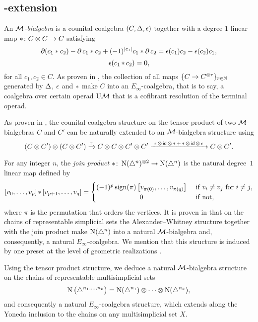 \subsection{\pdfEinfty-extension}\label{ss:e-infty extension}

An \textit{$\mathcal{M}$-bialgebra} is a counital coalgebra $(C, \operatorname{\Delta}, \operatorname{\epsilon})$ together with a degree $1$ linear map $\operatorname{\ast} \colon C \otimes C \to C$ satisfying
\[
\operatorname{\partial} (c_1 \ast c_2) - \operatorname{\partial} c_1 \ast c_2 + (-1)^{\lvert c_1\rvert} c_1 \ast \operatorname{\partial} c_2 =
\operatorname{\epsilon}(c_1) c_2 - \operatorname{\epsilon}(c_2) c_1,
\]
\[
\operatorname{\epsilon} (c_1 \operatorname{\ast} c_2) = 0,
\]
for all $c_1, c_2 \in C$.
As proven in \cite{medina2020prop1}, the collection of all maps $\{C \to C^{\otimes r}\}_{r \in \mathbb{N}}$ generated by $\operatorname{\Delta}$, $\operatorname{\epsilon}$ and $\operatorname{\ast}$ make $C$ into an $E_\infty$-coalgebra, that is to say, a coalgebra over certain operad $\mathrm{U}\mathcal{M}$ that is a cofibrant resolution of the terminal operad.

As proven in \cite{medina2021cobar}, the counital coalgebra structure on the tensor product of two $\mathcal{M}$-bialgebras $C$ and $C'$ can be naturally extended to an $\mathcal{M}$-bialgebra structure using
\[
(C \otimes C^\prime) \otimes (C \otimes C^\prime) \xrightarrow{\tau}
C \otimes C \otimes C^\prime \otimes C^\prime
\xrightarrow{\ \operatorname{\epsilon} \otimes \, \mathsf{id} \, \otimes \, \operatorname{\ast} + \operatorname{\ast} \otimes \, \mathsf{id} \, \otimes \,\operatorname{\epsilon}\ }
C \otimes C^\prime.
\]

For any integer $n$, the \textit{join product} $\ast \colon \operatorname{N}(\triangle^n)^{\otimes 2} \to \operatorname{N}(\triangle^n)$ is the natural degree~$1$ linear map defined by
\begin{equation*}
	\left[v_0, \dots, v_p \right] \pr \left[v_{p+1}, \dots, v_q\right] =
	\begin{cases}
		(-1)^{p} \sign(\pi) \left[v_{\pi(0)}, \dots, v_{\pi(q)}\right] &
		\text{ if } v_i \neq v_j \text{ for } i \neq j, \\
		\hfil 0 & \text{ if not},
	\end{cases}
\end{equation*}
where $\pi$ is the permutation that orders the vertices.
It is proven in \cite{medina2020prop1} that on the chains of representable simplicial sets the Alexander--Whitney structure together with the join product make $\operatorname{N}(\triangle^n)$ into a natural $\mathcal{M}$-bialgebra and, consequently, a natural $E_\infty$-coalgebra.
We mention that this structure is induced by one preset at the level of geometric realizations \cite{medina2021prop2}.

Using the tensor product structure, we deduce a natural $\mathcal{M}$-bialgebra structure on the chains of representable multisimplicial sets
\[
\operatorname{N}\big(\triangle^{n_1,\dots,n_k}\big) =
\operatorname{N}(\triangle^{n_1}) \otimes\dotsb\otimes \operatorname{N}(\triangle^{n_k}),
\]
and consequently a natural $E_\infty$-coalgebra structure, which extends along the Yoneda inclusion to the chains on any multisimplicial set $X$.

